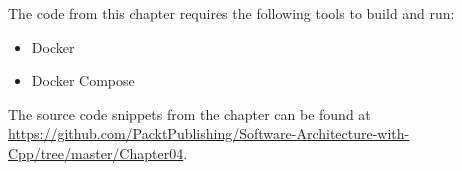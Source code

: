 
The code from this chapter requires the following tools to build and run:

\begin{itemize}
\item Docker
\item Docker Compose
\end{itemize}

The source code snippets from the chapter can be found at \url{https://github.com/PacktPublishing/Software-Architecture-with-Cpp/tree/master/Chapter04}.